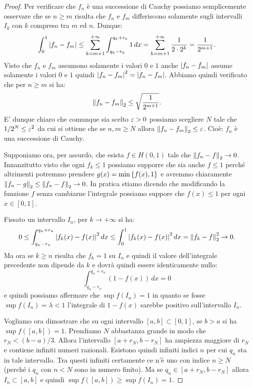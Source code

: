 \begin{proof}
Per verificare che $f_n$ è una successione di Cauchy possiamo semplicemente
osservare che se $n\ge m$ risulta che $f_n$ e $f_m$ differiscono solamente
sugli intervalli $I_k$ con $k$ compreso tra $m$ ed $n$. Dunque:
\[
  \int_0^1 {\left|f_n - f_m\right|}
  \le \sum_{k=m+1}^{+\infty} \int_{q_k-r_k}^{q_k+r_k} 1\,dx
  = \sum_{k=m+1}^{+\infty}\frac{1}{2\cdot 2^k} = \frac{1}{2^{m+1}}.
\]
Visto che $f_n$ e $f_m$ assumono solamente i valori $0$ e $1$ anche ${\left|f_n-f_m\right|}$
assume solamente i valori $0$ e $1$ quindi ${\left|f_n-f_m\right|}^2={\left|f_n-f_m\right|}$.
Abbiamo quindi verificato che per $n\ge m$ si ha:
\[
  {\left\Vert  f_n - f_m\right\Vert}_2 \le \sqrt{\frac{1}{2^{m+1}}}.
\]
E' dunque chiaro che comunque sia scelto $\varepsilon>0$ possiamo scegliere $N$
tale che $1/2^N \le \varepsilon^2$ da cui si ottiene che se $n,m\ge N$
allora ${\left\Vert f_n-f_m\right\Vert}_2 \le \varepsilon$. Cioè: $f_n$ è una successione di Cauchy.

Supponiamo ora, per assurdo, che esista $f\in H(0,1)$
tale che ${\left\Vert f_n-f\right\Vert}_2 \to 0$.
Innanzitutto visto che ogni $f_k\le 1$ possiamo supporre che sia anche $f\le 1$
perché altrimenti potremmo prendere $g(x) = \min{\left\{ f(x),1 \right\}}$ e avremmo
chiaramente ${\left\Vert f_n - g\right\Vert}_2 \le {\left\Vert f_n -f\right\Vert}_2 \to 0$. In pratica stiamo dicendo
che modificando la funzione $f$ senza cambiarne l'integrale possiamo suppore
che $f(x)\le 1$ per ogni $x\in[0,1]$.

Fissato un intervallo $I_n$, per $k\to +\infty$ si ha:
\[
  0\le \int_{q_n-r_n}^{q_n+r_n}{\left|f_k(x)-f(x)\right|}^2\, dx
  \le \int_0^1 {\left|f_k(x)-f(x)\right|}^2\, dx = {\left\Vert  f_k -f\right\Vert}_2^2 \to 0.
\]
Ma ora se $k\ge n$ risulta che $f_k=1$ su $I_n$ e quindi il valore dell'integrale
precedente non dipende da $k$ e dovrà quindi essere identicamente nullo:
\[
  \int_{q_n-r_n}^{q_n+r_n} (1-f(x)) \, dx = 0
\]
e quindi possiamo affermare che $\sup f(I_n) = 1$ in quanto se fosse
$\sup f(I_n) = \lambda < 1$
l'integrale di $1-f(x)$ sarebbe positivo
sull'intervallo $I_n$.

Vogliamo ora dimostrare che su ogni intervallo $[a,b]\subset[0,1]$, se $b>a$
si ha $\sup f([a,b])=1$. 
Prendiamo $N$ abbastanza grande in modo che $r_N < (b-a)/3$.
Allora l'intervallo $[a+r_N, b-r_N]$ ha ampiezza maggiore di $r_N$ e contiene infiniti
numeri razionali. 
Esistono quindi infiniti indici $n$ per cui $q_n$ sta in tale
intervallo. 
Tra questi infiniti certamente ce n'è uno con indice $n\ge N$
(perché i $q_n$ con $n<N$ sono in numero finito). 
Ma se $q_n \in [a+r_N,b-r_N]$
allora $I_n\subset[a,b]$ e quindi $\sup f([a,b])\ge \sup f(I_n) = 1$.


\end{proof}

